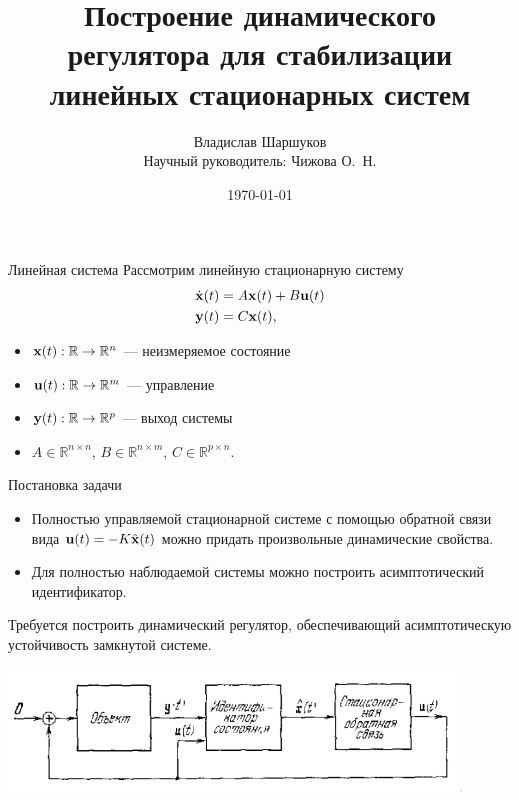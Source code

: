 \documentclass[notheorems,aspectratio=169]{beamer}
\author{Владислав Шаршуков\\\vspace{8mm}Научный руководитель: Чижова О.~Н.}
\date{\today}
\title{Построение динамического регулятора для стабилизации линейных стационарных систем}
\theoremstyle{definition}
\begin{document}
\begin{frame}
  \titlepage{}
\end{frame}

\begin{frame}{Линейная система}
  Рассмотрим линейную стационарную систему
  \begin{equation*}
    \begin{aligned}
      \dot{\vb{x}}(t) &= A \vb{x}(t) + B \vb{u}(t) \\
      \vb{y}(t) &= C \vb{x}(t),
    \end{aligned}
  \end{equation*}

  \begin{itemize}
  \item $\vb{x}(t): \mathbb{R} \to \mathbb{R}^n$ --- неизмеряемое состояние
  \item $\vb{u}(t): \mathbb{R} \to \mathbb{R}^m$ --- управление
  \item $\vb{y}(t): \mathbb{R} \to \mathbb{R}^p$ --- выход системы
  \item $A \in \mathbb{R}^{n \times n}$, $B \in \mathbb{R}^{n \times m}$, $C \in \mathbb{R}^{p \times n}$.
  \end{itemize}
\end{frame}

\begin{frame}{Постановка задачи}
  \begin{itemize}
  \item Полностью управляемой стационарной системе с помощью обратной связи
    вида $\vb{u}(t) = -K\hat{\vb{x}}(t)$ можно придать произвольные динамические
    свойства.~\cite{Andreev1976}

  \item Для полностью наблюдаемой системы можно построить асимптотический идентификатор.~\cite{Andreev1976,Smirnov2022}
  \end{itemize}

  Требуется построить динамический регулятор, обеспечивающий асимптотическую устойчивость замкнутой системе.

  \begin{center}
    \includegraphics[width=12cm]{Regulator}
  \end{center}
\end{frame}
\end{document}
